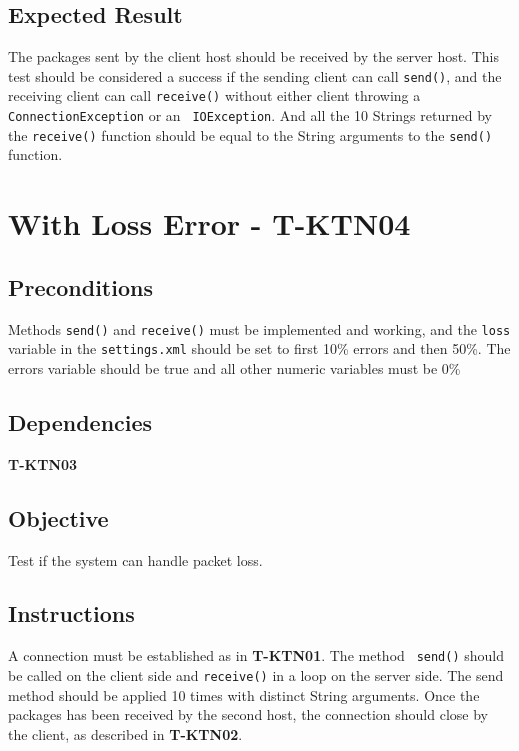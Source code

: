 \documentclass{article}
\begin{document}
\subsection{Expected Result}

The packages sent by the client host should be received by the server host.
This test should be considered a success if the sending client can call 
\texttt{send()}, and the receiving client can call \texttt{receive()}
without either client throwing a \texttt{ConnectionException} or an \texttt{%
IOException}. And all the 10 Strings returned by the \texttt{receive()}
function should be equal to the String arguments to the \texttt{send()}
function.

\section{With Loss Error - T-KTN04}

\subsection{Preconditions}

Methods \texttt{send()} and \texttt{receive()} must be implemented and
working, and the \texttt{loss} variable in the \texttt{settings.xml} should
be set to first 10\% errors and then 50\%. The errors variable should be
true and all other numeric variables must be 0\%

\subsection{Dependencies}

\textbf{T-KTN03}

\subsection{Objective}

Test if the system can handle packet loss. 

\subsection{Instructions}

A connection must be established as in \textbf{T-KTN01}. The method \texttt{%
send()} should be called on the client side and \texttt{receive()} in a loop
on the server side. The send method should be applied 10 times with distinct
String arguments. Once the packages has been received by the second host,
the connection should close by the client, as described in \textbf{T-KTN02}. 
\end{document}
